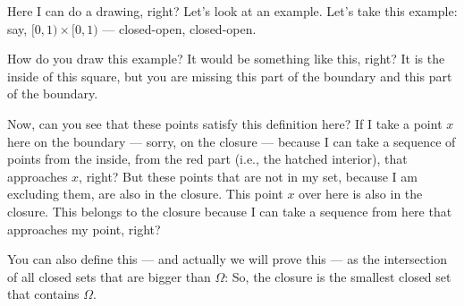 \begin{speech}[00:30:44 - 00:32:34]
Here I can do a drawing, right? Let's look at an example. \inlinemetanote{moves to the right chalkboard and writes \qt{Example $[0, 1) \times [0, 1) = \Omega$}} Let's take this example: say, $[0, 1) \times [0, 1)$ --- closed-open, closed-open.

How do you draw this example? It would be something like this, right?  It is the inside of this square, but you are missing this part of the boundary and this part of the boundary.

Now, can you see that these points satisfy this definition here? If I take a point $x$ here on the boundary --- sorry, on the closure --- because I can take a sequence of points from the inside, from the red part (i.e., the hatched interior), that approaches $x$, right? But these points that are not in my set, because I am excluding them, are also in the closure. This point $x$ over here is also in the closure.  This belongs to the closure because I can take a sequence from here that approaches my point, right?

You can also define this --- and actually we will prove this --- as the intersection of all closed sets that are bigger than $\Omega$:  So, the closure is the smallest closed set that contains $\Omega$.
\end{speech}

